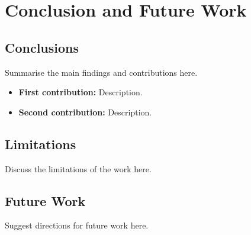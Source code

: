 
\chapter{Conclusion and Future Work}


\section{Conclusions}
Summarise the main findings and contributions here.

\begin{itemize}
    \item \textbf{First contribution:} Description.
    \item \textbf{Second contribution:} Description.
\end{itemize}

\section{Limitations}
Discuss the limitations of the work here.

\section{Future Work}
Suggest directions for future work here.

\newpage
